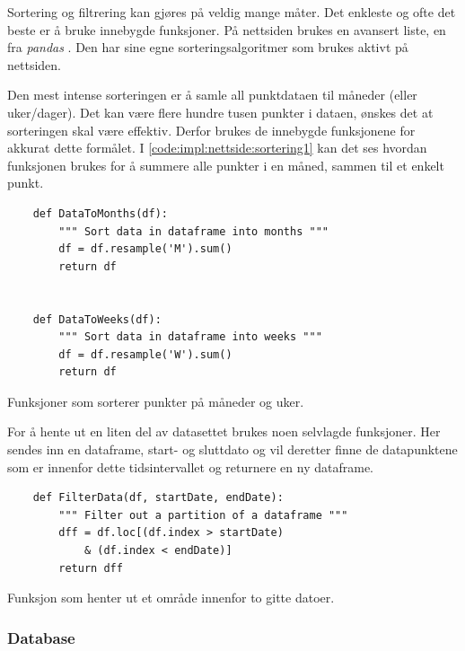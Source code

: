 Sortering og filtrering kan gjøres på veldig mange måter. 
Det enkleste og ofte det beste er å bruke innebygde funksjoner. 
På nettsiden brukes en avansert liste, en  fra \textit{pandas} \cite{dataframe}. 
Den har sine egne sorteringsalgoritmer som brukes aktivt på nettsiden. 

Den mest intense sorteringen er å samle all punktdataen til måneder (eller uker/dager). 
Det kan være flere hundre tusen punkter i dataen, ønskes det at sorteringen skal være effektiv. 
Derfor brukes de innebygde funksjonene for akkurat dette formålet. 
I \autoref{code:impl:nettside:sortering1} kan det ses hvordan funksjonen  brukes for å summere alle punkter i en måned, sammen til et enkelt punkt.

\begin{listing}[!htb]
\begin{verbatim}
    def DataToMonths(df):
        """ Sort data in dataframe into months """
        df = df.resample('M').sum()
        return df
    
    
    def DataToWeeks(df):
        """ Sort data in dataframe into weeks """
        df = df.resample('W').sum()
        return df
\end{verbatim}
\caption{Funksjoner som sorterer punkter på måneder og uker.}
\label{code:impl:nettside:sortering1}
\end{listing}

For å hente ut en liten del av datasettet brukes noen selvlagde funksjoner. 
Her sendes inn en dataframe, start- og sluttdato og vil deretter finne de datapunktene som er innenfor dette tidsintervallet og returnere en ny dataframe.

\begin{listing}[!htb]
\begin{verbatim}
    def FilterData(df, startDate, endDate):
        """ Filter out a partition of a dataframe """
        dff = df.loc[(df.index > startDate)
            & (df.index < endDate)]
        return dff
\end{verbatim}
\caption{Funksjon som henter ut et område innenfor to gitte datoer.}
\label{code:impl:nettside:sortering2}
\end{listing}


\subsubsection{Database}\label{sec:impl:nettside:database}

